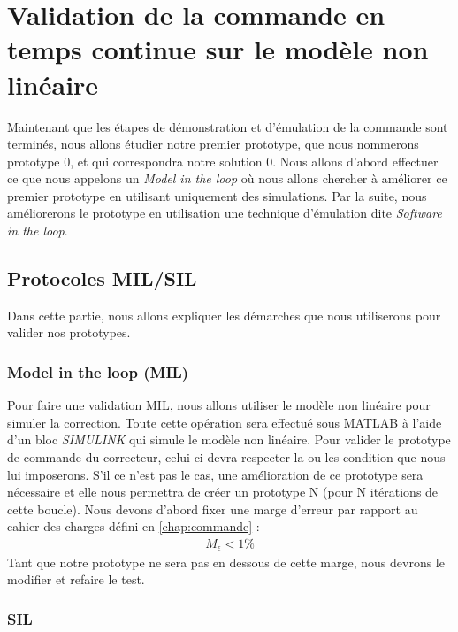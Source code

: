 \chapter{Validation de la commande en temps continue sur le modèle non linéaire}
\label{ValidationCommande}
Maintenant que les étapes de démonstration et d'émulation de la commande sont terminés, nous allons étudier notre premier prototype, que nous nommerons prototype 0, et qui correspondra  notre solution 0. Nous allons d'abord effectuer ce que nous appelons un \emph{Model in the loop} où nous allons chercher à améliorer ce premier prototype en utilisant uniquement des simulations. Par la suite, nous améliorerons le prototype en utilisation une technique d'émulation dite \emph{Software in the loop}.
\section{Protocoles MIL/SIL}\label{sec:prtocoleMIL_SIL}
Dans cette partie, nous allons expliquer les démarches que nous utiliserons pour valider nos prototypes. 
	\subsection{Model in the loop (MIL)}
	Pour faire une validation MIL, nous allons utiliser le modèle non linéaire pour simuler la correction. Toute cette opération sera effectué sous MATLAB à l'aide d'un bloc \emph{SIMULINK} qui simule le modèle non linéaire. Pour valider le prototype de commande du correcteur, celui-ci devra respecter la ou les condition que nous lui imposerons. S'il ce n'est pas le cas, une amélioration de ce prototype sera nécessaire et elle nous permettra de créer un prototype N (pour N itérations de cette boucle). 
	Nous devons d'abord fixer une marge d'erreur par rapport au cahier des charges défini en \ref{chap:commande} : 
	\begin{align}\label{eqn_margeErreur}
		M_\epsilon < 1\%
	\end{align}
	Tant que notre prototype ne sera pas en dessous de cette marge, nous devrons le modifier et refaire le test.
	\subsection{SIL}
